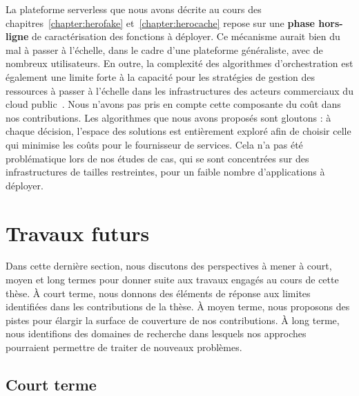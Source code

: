 La plateforme serverless que nous avons décrite au cours des chapitres~\ref{chapter:herofake} et~\ref{chapter:herocache} repose sur une \textbf{phase hors-ligne} de caractérisation des fonctions à déployer. Ce mécanisme aurait bien du mal à passer à l'échelle, dans le cadre d'une plateforme généraliste, avec de nombreux utilisateurs. En outre, la complexité des algorithmes d'orchestration est également une limite forte à la capacité pour les stratégies de gestion des ressources à passer à l'échelle dans les infrastructures des acteurs commerciaux du cloud public~\cite{fuerstIluvatarFastControl2023}. Nous n'avons pas pris en compte cette composante du coût dans nos contributions. Les algorithmes que nous avons proposés sont gloutons : à chaque décision, l'espace des solutions est entièrement exploré afin de choisir celle qui minimise les coûts pour le fournisseur de services. Cela n'a pas été problématique lors de nos études de cas, qui se sont concentrées sur des infrastructures de tailles restreintes, pour un faible nombre d'applications à déployer.

\section{Travaux futurs}
\label{section:conclusion-perspectives}

Dans cette dernière section, nous discutons des perspectives à mener à court, moyen et long termes pour donner suite aux travaux engagés au cours de cette thèse. À court terme, nous donnons des éléments de réponse aux limites identifiées dans les contributions de la thèse. À moyen terme, nous proposons des pistes pour élargir la surface de couverture de nos contributions. À long terme, nous identifions des domaines de recherche dans lesquels nos approches pourraient permettre de traiter de nouveaux problèmes.

\subsection{Court terme}

